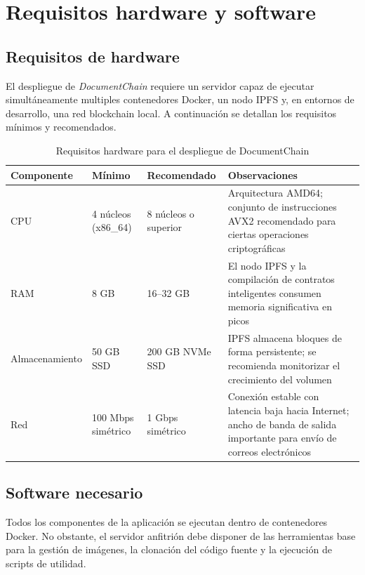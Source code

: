 \documentclass[11pt, a4paper]{article}
\begin{document}
\section{Requisitos hardware y software}

\subsection{Requisitos de hardware}

El despliegue de \textit{DocumentChain} requiere un servidor capaz de ejecutar simult\'{a}neamente multiples contenedores Docker, un nodo IPFS y, en entornos de desarrollo, una red blockchain local. A continuaci\'{o}n se detallan los requisitos m\'{i}nimos y recomendados.

\begin{table}[H]
\centering
\small
\renewcommand{\arraystretch}{1.4}
\begin{tabular}{@{}lp{3.2cm}p{3.2cm}p{4.5cm}@{}}
\toprule
\textbf{Componente} & \textbf{M\'{i}nimo} & \textbf{Recomendado} & \textbf{Observaciones} \\
\midrule
CPU & 4 n\'{u}cleos (x86\_64) & 8 n\'{u}cleos o superior & Arquitectura AMD64; conjunto de instrucciones AVX2 recomendado para ciertas operaciones criptogr\'{a}ficas \\
RAM & 8 GB & 16--32 GB & El nodo IPFS y la compilaci\'{o}n de contratos inteligentes consumen memoria significativa en picos \\
Almacenamiento & 50 GB SSD & 200 GB NVMe SSD & IPFS almacena bloques de forma persistente; se recomienda monitorizar el crecimiento del volumen \\
Red & 100 Mbps sim\'{e}trico & 1 Gbps sim\'{e}trico & Conexi\'{o}n estable con latencia baja hacia Internet; ancho de banda de salida importante para env\'{i}o de correos electr\'{o}nicos \\
\bottomrule
\end{tabular}
\caption{Requisitos hardware para el despliegue de DocumentChain}
\label{tab:req-hardware}
\end{table}

\subsection{Software necesario}

Todos los componentes de la aplicaci\'{o}n se ejecutan dentro de contenedores Docker. No obstante, el servidor anfitri\'{o}n debe disponer de las herramientas base para la gesti\'{o}n de im\'{a}genes, la clonaci\'{o}n del c\'{o}digo fuente y la ejecuci\'{o}n de scripts de utilidad.
\end{document}
